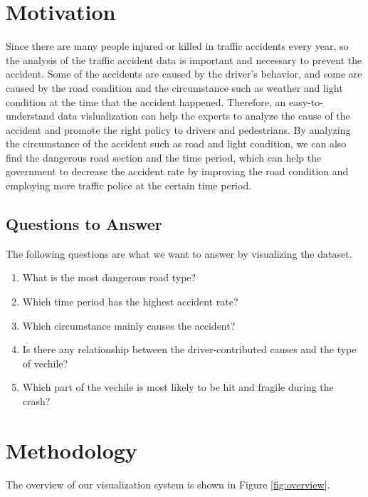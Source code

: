 \documentclass[a4paper, oneside, final, 12pt]{scrartcl} %
\begin{document}
\section{Motivation}

Since there are many people injured or killed in traffic accidents every year,
so the analysis of the traffic accident data 
is important and necessary to prevent the accident.
Some of the accidents are caused by the driver's behavior,
and some are caused by the road condition 
and the circumstance such as weather and light condition at the time that the accident happened.
Therefore, an easy-to-understand data vislualization 
can help the experts to analyze the cause of the accident
and promote the right policy to drivers and pedestrians.
By analyzing the circumstance of the accident such as road and light condition,
we can also find the dangerous road section and the time period,
which can help the government to decrease the accident rate 
by improving the road condition and employing more traffic police at the certain time period.

\subsection{Questions to Answer}

The following questions are what we want to answer by visualizing the dataset.

\begin{enumerate}
  \item What is the most dangerous road type?
  \item Which time period has the highest accident rate?
  \item Which circumstance mainly causes the accident?
  \item Is there any relationship between the 
  driver-contributed causes and the type of vechile?
  \item Which part of the vechile is most likely to be hit and fragile during the crash?
\end{enumerate}

\section{Methodology}

The overview of our visualization system is shown in Figure \ref{fig:overview}.
\end{document}
